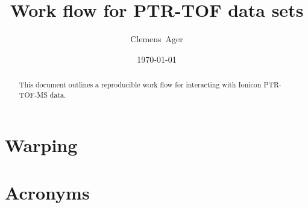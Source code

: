 \documentclass[twocolumn]{article}
\title{Work flow for PTR-TOF data sets}
\author{Clemens~Ager}
\date{\today}
\begin{document}
\maketitle

\begin{abstract}
  This document outlines a reproducible work flow for interacting with
  Ionicon \ac{PTR-TOF-MS} data.  
\end{abstract}


\setcounter{tocdepth}{2}
\tableofcontents



\section{Warping}



\appendix 
\section{Acronyms}




\end{document}

